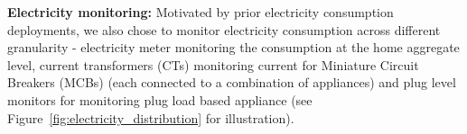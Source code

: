\documentclass[10pt]{sensys-proc}
\newcommand{\figref}[1]{Figure~\ref{#1}}
\begin{document}
\noindent\textbf{Electricity monitoring:} %
Motivated by prior electricity consumption deployments, we also chose to monitor electricity consumption across different granularity - electricity meter monitoring the consumption at the home aggregate level, current transformers (CTs) monitoring current for Miniature Circuit Breakers (MCBs) (each connected to a combination of appliances) and plug level monitors for monitoring plug load based appliance (see \figref{fig:electricity_distribution} for illustration). 
\end{document}
